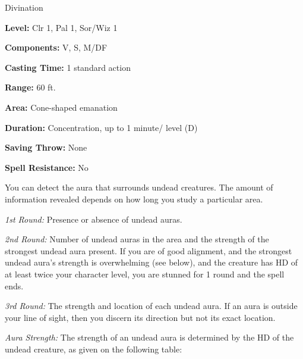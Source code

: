 
Divination

\textbf{Level:} Clr 1, Pal 1, Sor/Wiz 1

\textbf{Components:} V, S, M/DF

\textbf{Casting Time:} 1 standard action

\textbf{Range:} 60 ft.

\textbf{Area:} Cone-shaped emanation

\textbf{Duration:} Concentration, up to 1 minute/ level (D)

\textbf{Saving Throw:} None

\textbf{Spell Resistance:} No

You can detect the aura that surrounds undead creatures. The amount of information 
revealed depends on how long you study a particular area.

\textit{1st Round:} Presence or absence of undead auras.

\textit{2nd Round:} Number of undead auras in the area and the strength of the 
strongest undead aura present. If you are of good alignment, and the strongest 
undead aura's strength is overwhelming (see below), and the creature has HD of 
at least twice your character level, you are stunned for 1 round and the spell 
ends.

\textit{3rd Round:} The strength and location of each undead aura. If an aura is 
outside your line of sight, then you discern its direction but not its exact location.

\textit{Aura Strength:} The strength of an undead aura is determined by the HD 
of the undead creature, as given on the following table:

